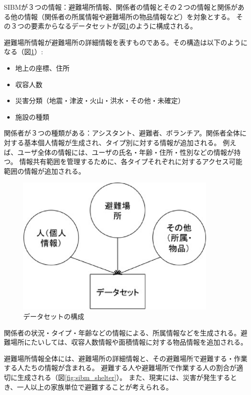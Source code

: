 SIBMが３つの情報：避難場所情報、関係者の情報とその２つの情報と関係がある他の情報（関係者の所属情報や避難場所の物品情報など）を対象とする。
その３つの要素からなるデータセットが図\ref{fig:sibm_structrure}のように構成される。

避難場所情報が避難場所の詳細情報を表すものである。その構造は以下のようになる（図\ref{fig:sibm_structrure}）:

\begin{itemize}
  \item 地上の座標、住所
  \item 収容人数
  \item 災害分類（地震・津波・火山・洪水・その他・未確定）
  \item 施設の種類
\end{itemize}

関係者が３つの種類がある：アシスタント、避難者、ボランチア。関係者全体に対する基本個人情報が生成され、タイプ別に対する情報が追加される。
例えば、ユーザ全体の情報には、ユーザの氏名・年齢・住所・性別などの情報が持つ。
情報共有範囲を管理するために、各タイプそれぞれに対するアクセス可能範囲の情報が追加される。

\begin{figure}[h!]
 	\begin{center}
 		\includegraphics[width=100mm]{./images/sibm_construct.eps}
 		\caption{データセットの構成}
 		\label{fig:sibm_structrure}
 	\end{center}
\end{figure}

関係者の状況・タイプ・年齢などの情報による、所属情報などを生成される。避難場所にたいしては、収容人数情報や面積情報に対する物品情報を追加される。

避難場所情報全体には、避難場所の詳細情報と、その避難場所で避難する・作業する人たちの情報が含まれる。
避難する人や避難場所で作業する人の割合が適切に生成される（図\ref{fig:sibm_shelter}）。
また、現実には、災害が発生するとき、一人以上の家族単位で避難することが考えられる。

